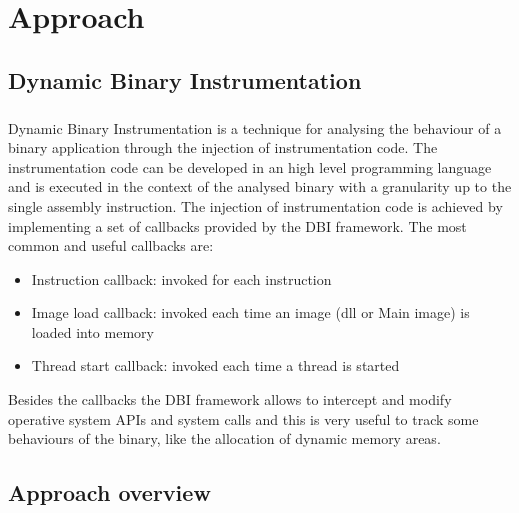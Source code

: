 \chapter{Approach}
\label{chapter3}
\thispagestyle{empty}

\section{Dynamic Binary Instrumentation}
\paragraph{}
Dynamic Binary Instrumentation is a technique for analysing the behaviour of a binary application through the injection of instrumentation code. The instrumentation code can be developed in an high level programming language and is executed in the context of the analysed binary with a granularity up to the single assembly instruction. The injection of instrumentation code is achieved by implementing a set of callbacks provided by the DBI framework. The most common and useful callbacks are:
\begin{itemize}
 \item Instruction callback: invoked for each instruction
 \item Image load callback: invoked each time an image (dll or Main image) is loaded into memory
 \item Thread start callback: invoked each time a thread is started
\end{itemize}
Besides the callbacks the DBI framework allows to intercept and modify operative system APIs and system calls and this is very useful to track some behaviours of the binary, like the allocation of dynamic memory areas.

\section{Approach overview}
